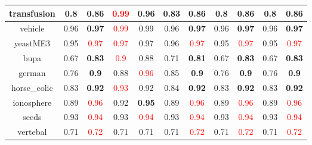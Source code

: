 \documentclass{article}%
\begin{document}
\begin{tabular}{c|cccccccccc}
\hline%
transfusion&0.8&\textbf{0.86}&\textcolor{red}{ 
0.99
}&0.96&0.83&\textbf{0.86}&0.8&\textbf{0.86}&0.8&\textbf{0.86}\\%
\hline%
vehicle&0.96&\textbf{0.97}&\textcolor{red}{ 
0.99
}&0.99&0.96&\textbf{0.97}&0.96&\textbf{0.97}&0.96&\textbf{0.97}\\%
\hline%
yeastME3&0.95&\textcolor{red}{ 
0.97
}&\textcolor{red}{ 
0.97
}&0.97&0.96&\textcolor{red}{ 
0.97
}&0.95&\textcolor{red}{ 
0.97
}&0.95&\textcolor{red}{ 
0.97
}\\%
\hline%
bupa&0.67&\textbf{0.83}&\textcolor{red}{ 
0.9
}&0.88&0.71&\textbf{0.81}&0.67&\textbf{0.83}&0.67&\textbf{0.83}\\%
\hline%
german&0.76&\textbf{0.9}&0.88&\textcolor{red}{ 
0.96
}&0.85&\textbf{0.9}&0.76&\textbf{0.9}&0.76&\textbf{0.9}\\%
\hline%
horse\_colic&0.83&\textbf{0.92}&\textcolor{red}{ 
0.93
}&0.92&0.84&\textbf{0.92}&0.83&\textbf{0.92}&0.83&\textbf{0.92}\\%
\hline%
ionosphere&0.89&\textcolor{red}{ 
0.96
}&0.92&\textbf{0.95}&0.89&\textcolor{red}{ 
0.96
}&0.89&\textcolor{red}{ 
0.96
}&0.89&\textcolor{red}{ 
0.96
}\\%
\hline%
seeds&0.93&\textcolor{red}{ 
0.94
}&0.93&\textcolor{red}{ 
0.94
}&0.93&\textcolor{red}{ 
0.94
}&0.93&\textcolor{red}{ 
0.94
}&0.93&\textcolor{red}{ 
0.94
}\\%
\hline%
vertebal&0.71&\textcolor{red}{ 
0.72
}&0.71&0.71&0.71&\textcolor{red}{ 
0.72
}&0.71&\textcolor{red}{ 
0.72
}&0.71&\textcolor{red}{ 
0.72
}\\%
\hline%
\end{tabular}

%
\end{document}
